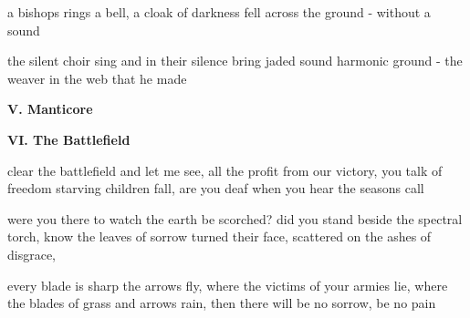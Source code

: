 \documentclass{article}
\renewcommand{\part}[1]{
  \begin{center}
    \textbf{#1}
  \end{center}
  \fontcream
}
\begin{document}
a bishops rings a bell,
a cloak of darkness fell across the ground
- without a sound

the silent choir sing and in their silence
bring jaded sound harmonic ground
- the weaver in the web that he made

\part{V. Manticore}

\part{VI. The Battlefield}

clear the battlefield and let me see,
all the profit from our victory,
you talk of freedom starving children fall,
are you deaf when you hear the seasons call

were you there to watch the earth be scorched?
did you stand beside the spectral torch,
know the leaves of sorrow turned their face,
scattered on the ashes of disgrace,

every blade is sharp the arrows fly,
where the victims of your armies lie,
where the blades of grass and arrows rain,
then there will be no sorrow,
be no pain
\end{document}
